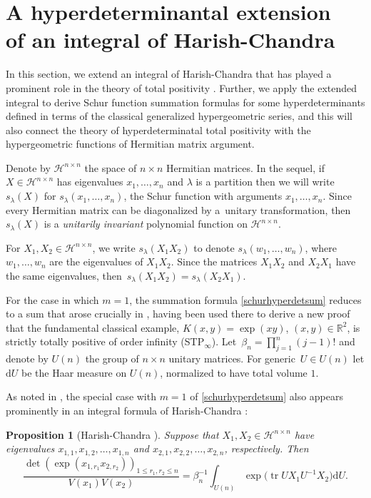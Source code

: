 \documentclass[pdftex]{sigma}
\numberwithin{equation}{section}
\newtheorem{Proposition}[Theorem]{Proposition}
 { \theoremstyle{definition}
\newtheorem{Definition}[Theorem]{Definition}
\newtheorem{Note}[Theorem]{Note}
\newtheorem{Example}[Theorem]{Example}
\newtheorem{Remark}[Theorem]{Remark} }
\def\R{{\mathbb R}}
\def\dd{ \mathrm{d}}
\def\tr{\operatorname{tr} }
\def\mcalHn{\mathcal{H}^{n \times n}}
\begin{document}
\section[A hyperdeterminantal extension of an integral of Harish-Chandra]{A hyperdeterminantal extension\\ of an integral of Harish-Chandra}
\label{sec_extension_HC}

In this section, we extend an integral of Harish-Chandra \cite{harishchandra} that has played a prominent role in the theory of total positivity \cite{grossrichards89,grossrichards95}. Further, we apply the extended integral to derive Schur function summation formulas for some hyperdeterminants defined in terms of the classical generalized hypergeometric series, and this will also connect the theory of hyperdeterminatal total positivity with the hypergeometric functions of Hermitian matrix argument.

Denote by $\mcalHn$ the space of $n \times n$ Hermitian matrices. In the sequel, if $X \in \mcalHn$ has eigenvalues $x_1,\dots,x_n$ and $\lambda$ is a partition then we will write $s_\lambda(X)$ for $s_\lambda(x_1,\dots,x_n)$, the Schur function with arguments $x_1,\dots,x_n$. Since every Hermitian matrix can be diagonalized by a~unitary transformation, then $s_\lambda(X)$ is a {\it unitarily invariant} polynomial function on $\mcalHn$.

For $X_1, X_2 \in \mcalHn$, we write $s_\lambda(X_1X_2)$ to denote $s_\lambda(w_1,\dots,w_n)$, where $w_1,\dots,w_n$ are the eigenvalues of $X_1X_2$. Since the matrices $X_1X_2$ and $X_2X_1$ have the same eigenvalues, then~${s_\lambda(X_1X_2) = s_\lambda(X_2X_1)}$.

For the case in which $m=1$, the summation formula \eqref{schurhyperdetsum} reduces to a sum that arose crucially in \cite{grossrichards89}, having been used there to derive a new proof that the fundamental classical example, $K(x,y) = \exp(xy)$, $(x,y) \in \R^2$, is strictly totally positive of order infinity (STP$_\infty$). Let~${
\beta_n = \prod_{j=1}^n (j-1)!}
$
and denote by $U(n)$ the group of $n \times n$ unitary matrices. For generic~${U \in U(n)}$ let $\dd U$ be the Haar measure on $U(n)$, normalized to have total volume $1$.

As noted in \cite{grossrichards89}, the special case with $m=1$ of \eqref{schurhyperdetsum} also appears prominently in an integral formula of Harish-Chandra \cite{harishchandra}:

\begin{Proposition}[Harish-Chandra \cite{harishchandra}]
\label{prop_hc_integral}
Suppose that $X_1, X_2 \in \mcalHn$ have eigenvalues $x_{1,1},\allowbreak x_{1,2}, \dots,x_{1,n}$ and $x_{2,1},x_{2,2},\dots,x_{2,n}$, respectively. Then
\begin{equation}
\frac{\det(\exp(x_{1,r_1} x_{2,r_2}))_{1 \le r_1,r_2\le n}}{V(x_1) V(x_2)} = \beta_n^{-1} \int_{U(n)} \exp\bigl(\tr UX_1U^{-1}X_2\bigr) \dd U.\label{hcintegraldet}
\end{equation}
\end{Proposition}
\end{document}
